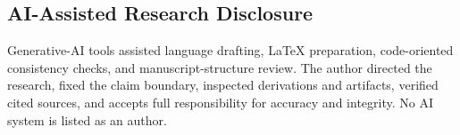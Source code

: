 \documentclass[11pt,a4paper]{article}
\theoremstyle{definition}
\theoremstyle{remark}
\begin{document}
\subsection*{AI-Assisted Research Disclosure}
Generative-AI tools assisted language drafting, LaTeX preparation, code-oriented consistency checks, and manuscript-structure review. The author directed the research, fixed the claim boundary, inspected derivations and artifacts, verified cited sources, and accepts full responsibility for accuracy and integrity. No AI system is listed as an author.



\end{document}
